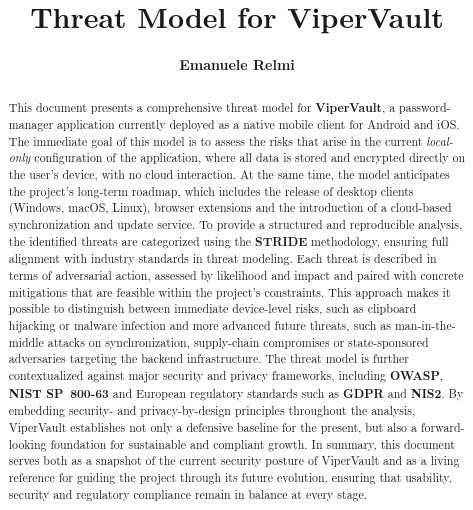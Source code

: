 \documentclass[11pt, a4paper]{article}
\title{\textbf{Threat Model for ViperVault}}
\author{\textbf{Emanuele Relmi}}
\date{}
\begin{document}
	\maketitle
	\vspace{1cm}
	
	\begin{abstract}
		\noindent This document presents a comprehensive threat model for \textbf{ViperVault}, a password-manager application currently deployed as a native mobile client for Android and iOS.
        The immediate goal of this model is to assess the risks that arise in the current \emph{local-only} configuration of the application, where all data is stored and encrypted directly on the user’s device, with no cloud interaction.
        At the same time, the model anticipates the project’s long-term roadmap, which includes the release of desktop clients (Windows, macOS, Linux), browser extensions and the introduction of a cloud-based synchronization and update service.
        To provide a structured and reproducible analysis, the identified threats are categorized using the \textbf{STRIDE} methodology, ensuring full alignment with industry standards in threat modeling.
        Each threat is described in terms of adversarial action, assessed by likelihood and impact and paired with concrete mitigations that are feasible within the project’s constraints.
        This approach makes it possible to distinguish between immediate device-level risks, such as clipboard hijacking or malware infection and more advanced future threats, such as man-in-the-middle attacks on synchronization, supply-chain compromises or state-sponsored adversaries targeting the backend infrastructure.
        The threat model is further contextualized against major security and privacy frameworks, including \textbf{OWASP}, \textbf{NIST SP~800-63} and European regulatory standards such as \textbf{GDPR} and \textbf{NIS2}.
        By embedding security- and privacy-by-design principles throughout the analysis, ViperVault establishes not only a defensive baseline for the present, but also a forward-looking foundation for sustainable and compliant growth.
        In summary, this document serves both as a snapshot of the current security posture of ViperVault and as a living reference for guiding the project through its future evolution, ensuring that usability, security and regulatory compliance remain in balance at every stage.
	\end{abstract}
	
	\newpage
	\tableofcontents
	\newpage

	
	
	
	
	
	
	

\end{document}

